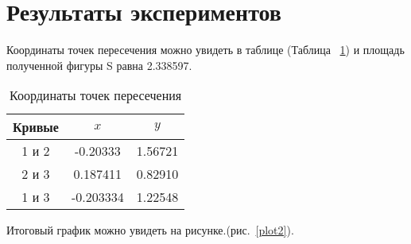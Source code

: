 \documentclass[a4paper,12pt,titlepage,finall]{article}
\begin{document}
\newpage

\section{Результаты экспериментов}

Координаты точек пересечения можно увидеть в таблице (Таблица ~\ref{table1}) и площадь полученной фигуры S равна 2.338597.

\begin{table}[h]
\centering
\begin{tabular}{|c|c|c|}
\hline
Кривые & $x$ & $y$ \\
\hline
1 и 2 &  -0.20333 & 1.56721 \\
2 и 3 &  0.187411 & 0.82910 \\
1 и 3 & -0.203334 & 1.22548 \\
\hline
\end{tabular}
\caption{Координаты точек пересечения}
\label{table1}
\end{table}


Итоговый график можно увидеть на рисунке.(рис.~\ref{plot2}).
\end{document}

